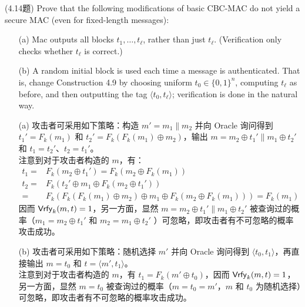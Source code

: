 \begin{questions}
    \question (4.14题) Prove that the following modifications of basic CBC-MAC do not yield a secure MAC (even for fixed-length messages):

        \begin{enumerate}
            \item[(a)] Mac outputs all blocks $t_1,\dots,t_\ell$, rather than just $t_\ell$. (Verification only checks whether $t_\ell$ is correct.)
            \item[(b)] A random initial block is used each time a message is authenticated. That is, change Construction 4.9 by choosing uniform $t_0\in\{0,1\}^n$, computing $t_\ell$ as before, and then outputting the tag $\langle{t_0,t_\ell}\rangle$; verification is done in the natural way.
        \end{enumerate}

        \begin{solution}
            \begin{enumerate}
                \item[(a)] 攻击者可采用如下策略：构造 $m'=m_1\parallel{m_2}$ 并向 Oracle 询问得到 $t_1'=F_k(m_1)$ 和 $t_2'=F_k(F_k(m_1)\oplus{m_2})$，输出 $m=m_2\oplus{t_1'}\parallel{m_1}\oplus{t_2'}$ 和 $t_1=t_2'$、$t_2=t_1'$。\\
                注意到对于攻击者构造的 $m$，有：
                \begin{equation}
                    \begin{aligned}
                        t_1=&F_k(m_2\oplus{t_1'})=F_k(m_2\oplus{F_k(m_1)})\\
                        t_2=&F_k(t_2'\oplus{m_1}\oplus{F_k(m_2\oplus{t_1'})})\\
                        =&F_k(F_k(F_k(m_1)\oplus{m_2})\oplus{m_1}\oplus{F_k(m_2\oplus{F_k(m_1)})})=F_k(m_1)
                    \end{aligned}
                \end{equation}
                因而 $\mathsf{Vrfy}_k(m,t)=1$，另一方面，显然 $m=m_2\oplus{t_1'}\parallel{m_1}\oplus{t_2'}$ 被查询过的概率（$m_1=m_2\oplus{t_1'}$ 和 $m_2=m_1\oplus{t_2'}$ ）可忽略，即攻击者有不可忽略的概率攻击成功。
                \item[(b)] 攻击者可采用如下策略：随机选择 $m'$ 并向 Oracle 询问得到 $\langle{t_0,t_1}\rangle$，再直接输出 $m=t_0$ 和 $t=\langle{m',t_1}\rangle$。\\
                注意到对于攻击者构造的 $m$，有 $t_1=F_k(m'\oplus{t_0})$，因而 $\mathsf{Vrfy}_k(m,t)=1$，另一方面，显然 $m=t_0$ 被查询过的概率（$m=t_0=m'$，$m$ 和 $t_0$ 为随机选择）可忽略，即攻击者有不可忽略的概率攻击成功。
            \end{enumerate}
        \end{solution}


\end{questions}
